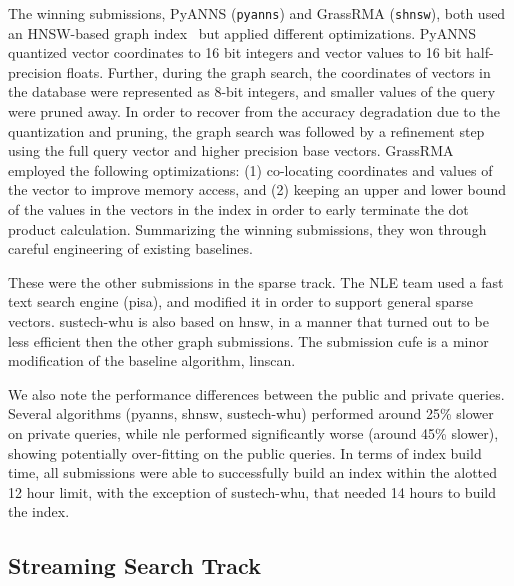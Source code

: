 The winning submissions, PyANNS (\texttt{pyanns}) and GrassRMA (\texttt{shnsw}), both used an HNSW-based graph index~\cite{HNSW16} but applied different optimizations.
PyANNS quantized vector coordinates to 16 bit integers and vector values to 16 bit half-precision floats.
Further, during the graph search, the coordinates of vectors in the database were represented as 8-bit integers,
and smaller values of the query were pruned away.
In order to recover from the accuracy degradation due to the quantization and pruning,
the graph search was followed by a refinement step using the full query vector and
higher precision base vectors.  GrassRMA employed the following optimizations: 
(1) co-locating coordinates and values of  the vector to  improve memory access, and 
(2) keeping an upper and lower bound of the values in the vectors in the index
in order to early terminate the dot product calculation.%
Summarizing the winning submissions, they won through careful engineering of existing baselines. 

\ifarxiv
These were the other submissions in the sparse track. 
%
The NLE team used a fast text search engine (pisa\cite{mallia2019pisa}), and modified it in order to support general sparse vectors.
%
sustech-whu is also based on hnsw, in a manner that turned out to be less efficient then the other graph submissions.
%
The submission cufe is a minor modification of the baseline algorithm, linscan\cite{bruch2023approximate}. 

\fi

We also note the performance differences between the public and private queries.
%
Several algorithms (pyanns,  shnsw, sustech-whu) performed around 25\% slower on private queries,
while nle performed significantly worse (around 45\% slower), showing potentially over-fitting on the public queries.
%
\ifarxiv
In terms of index build time, all submissions were able to successfully build an index within the alotted 12 hour limit,
with the exception of sustech-whu, that needed 14 hours to build the index.
\fi

\subsection{Streaming Search Track}

